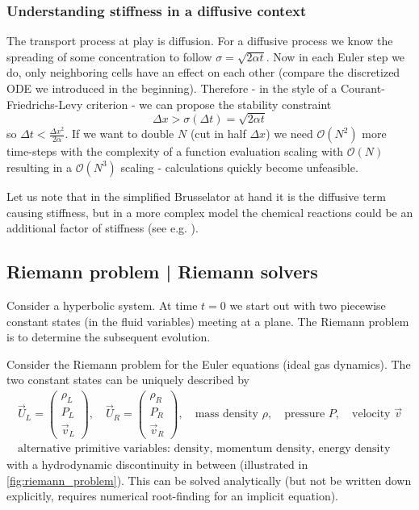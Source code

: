 \subsubsection*{Understanding stiffness in a diffusive context}

The transport process at play is diffusion. For a diffusive process we know the spreading of some concentration to follow $\sigma = \sqrt{2\alpha t}$. Now in each Euler step we do, only neighboring cells have an effect on each other (compare the discretized ODE we introduced in the beginning). Therefore - in the style of a Courant-Friedrichs-Levy criterion \citep{Courant1928} - we can propose the stability constraint
$$\Delta x > \sigma(\Delta t) = \sqrt{2\alpha t}$$
so $\Delta t < \frac{\Delta x^2}{2 \alpha}$. If we want to double $N$ (cut in half $\Delta x$) we need $\mathcal O(N^2)$ more time-steps with the complexity of a function evaluation scaling with $\mathcal O(N)$ resulting in a $\mathcal O(N^3)$ scaling - calculations quickly become unfeasible.

Let us note that in the simplified Brusselator at hand it is the diffusive term causing stiffness, but in a more complex model the chemical reactions could be an additional factor of stiffness (see e.g. \cite{chou07}).

\subsection{Riemann problem | Riemann solvers}
Consider a hyperbolic system. At time $t=0$ we start out with two
piecewise constant states (in the fluid variables) meeting at a plane.
The Riemann problem is to determine the subsequent evolution.


Consider the \textcolor{blue1}{Riemann problem for the Euler equations} (ideal gas dynamics).
The two constant states can be uniquely described by
\begin{equation}
    \begin{gathered}
        \vec{U}_L = \begin{pmatrix} \rho_L \\ P_L \\ \vec{v}_L \end{pmatrix}, \quad \vec{U}_R = \begin{pmatrix} \rho_R \\ P_R \\ \vec{v}_R \end{pmatrix}, \quad \text{mass density } \rho, \quad \text{pressure } P, \quad \text{velocity } \vec{v} \\
        \text{alternative primitive variables: density, momentum density, energy density}
    \end{gathered}  
\end{equation}
with a hydrodynamic discontinuity in between (illustrated in \ref{fig:riemann_problem}). This can be solved analytically (but not be written down explicitly, requires numerical root-finding for an implicit equation).

